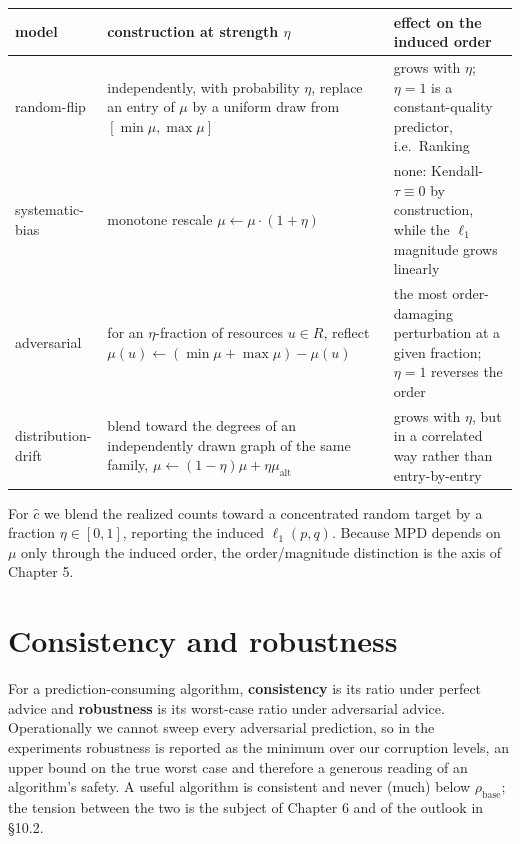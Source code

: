 { %
\begin{longtable}[]{@{}
  >{\raggedright\arraybackslash}p{}
  >{\raggedright\arraybackslash}p{}
  >{\raggedright\arraybackslash}p{}@{}}
\toprule\noalign{}
\begin{minipage}[b]{\linewidth}\raggedright
model
\end{minipage} & \begin{minipage}[b]{\linewidth}\raggedright
construction at strength \(\eta\)
\end{minipage} & \begin{minipage}[b]{\linewidth}\raggedright
effect on the induced order
\end{minipage} \\
\midrule\noalign{}
\endhead
\bottomrule\noalign{}
\endlastfoot
random-flip & independently, with probability \(\eta\), replace an entry
of \(\mu\) by a uniform draw from \([\min\mu,\max\mu]\) & grows with
\(\eta\); \(\eta=1\) is a constant-quality predictor, i.e.~Ranking \\
systematic-bias & monotone rescale \(\mu\leftarrow\mu\cdot(1+\eta)\) &
none: Kendall-\(\tau\equiv0\) by construction, while the \(\ell_1\)
magnitude grows linearly \\
adversarial & for an \(\eta\)-fraction of resources \(u\in R\), reflect
\(\mu(u)\leftarrow(\min\mu+\max\mu)-\mu(u)\) & the most order-damaging
perturbation at a given fraction; \(\eta=1\) reverses the order \\
distribution-drift & blend toward the degrees of an independently drawn
graph of the same family,
\(\mu\leftarrow(1-\eta)\mu+\eta\mu_{\mathrm{alt}}\) & grows with
\(\eta\), but in a correlated way rather than entry-by-entry \\
\end{longtable}
}

For \(\hat c\) we blend the realized counts toward a concentrated random
target by a fraction \(\eta\in[0,1]\), reporting the induced
\(\ell_1(p,q)\). Because MPD depends on \(\mu\) only through the induced
order, the order/magnitude distinction is the axis of Chapter 5.

\section{Consistency and robustness}

For a prediction-consuming algorithm, \textbf{consistency} is its ratio
under perfect advice and \textbf{robustness} is its worst-case ratio
under adversarial advice. Operationally we cannot sweep every
adversarial prediction, so in the experiments robustness is reported as
the minimum over our corruption levels, an upper bound on the true worst
case and therefore a generous reading of an algorithm's safety. A useful
algorithm is consistent and never (much) below \(\rho_{\mathrm{base}}\);
the tension between the two is the subject of Chapter 6 and of the
outlook in §10.2.

